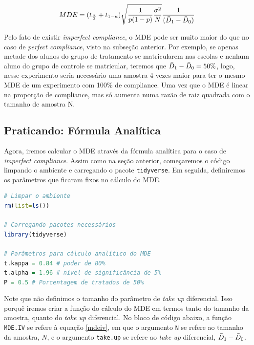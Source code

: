 \begin{equation}\label{mdeiv}
    MDE = (t_{\frac{\alpha}{2}} + t_{1-\kappa})\sqrt{\frac{1}{p(1-p)}\frac{\sigma^2}{N}}\frac{1}{(\Bar{D}_1 - \Bar{D}_0)}
\end{equation}
  

Pelo fato de existir \textit{imperfect compliance}, o MDE pode ser muito maior do que no caso de \textit{perfect compliance}, visto na subseção anterior. Por exemplo, se apenas metade dos alunos do grupo de tratamento se matricularem nas escolas e nenhum aluno do grupo de controle se matricular, teremos que $\Bar{D}_1 - \Bar{D}_0 = 50\%$, logo, nesse experimento seria necessário uma amostra 4 vezes maior para ter o mesmo MDE de um experimento com 100\% de compliance. Uma vez que o MDE é linear na proporção de compliance, mas só aumenta numa razão de raiz quadrada com o tamanho de amostra N.

\subsection{\sc Praticando: Fórmula Analítica}

Agora, iremos calcular o MDE através da fórmula analítica para o caso de \textit{imperfect compliance}. Assim como na seção anterior, começaremos o código limpando o ambiente e carregando o pacote \texttt{tidyverse}. Em seguida, definiremos os parâmetros que ficaram fixos no cálculo do MDE.

\begin{boxH}
\begin{lstlisting}[language = R]
# Limpar o ambiente 
rm(list=ls())

# Carregando pacotes necessários
library(tidyverse)

# Parâmetros para cálculo analítico do MDE
t.kappa = 0.84 # poder de 80%
t.alpha = 1.96 # nível de significância de 5%
P = 0.5 # Porcentagem de tratados de 50%
\end{lstlisting}
\end{boxH}

Note que não definimos o tamanho do parâmetro de \textit{take up} diferencial. Isso porquê iremos criar a função do cálculo do MDE em termos tanto do tamanho da amostra, quanto do \textit{take up} diferencial. No bloco de código abaixo, a função \texttt{MDE.IV} se refere à equação \eqref{mdeiv}, em que o argumento \texttt{N} se refere ao tamanho da amostra, $N$, e o argumento \texttt{take.up} se refere ao \textit{take up} diferencial, $\Bar{D}_1 - \Bar{D}_0$.

